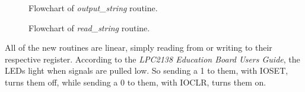 \documentclass[letterpaper,10pt]{article}
\begin{document}
    \begin{figure}[p]
        
        \caption{Flowchart of \textit{output\_string} routine.}
        \label{flo:output_string}
    \end{figure}

    \begin{figure}[p]
        
        \caption{Flowchart of \textit{read\_string} routine.}
        \label{flo:read_string}
    \end{figure}

    All of the new routines are linear, simply reading from or writing to
    their respective register. According to the \textit{LPC2138 Education Board
    Users Guide}, the LEDs light when signals are pulled low. So sending a 1
    to them, with IOSET, turns them off, while sending a 0 to them, with IOCLR,
    turns them on.
\end{document}
